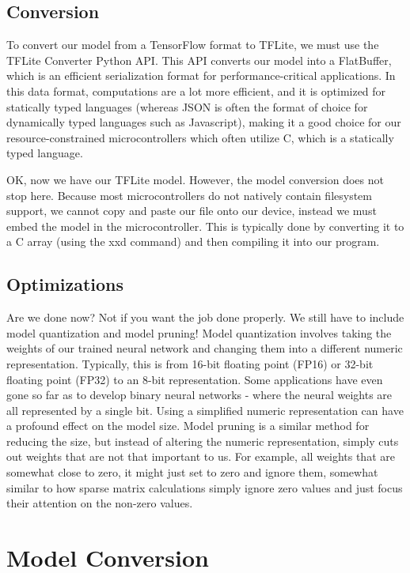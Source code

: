 {{{{{    \subsection{Conversion}
    
    To convert our model from a TensorFlow format to TFLite, we must use the TFLite Converter Python API. This API converts our model into a FlatBuffer, which is an efficient serialization format for performance-critical applications. In this data format, computations are a lot more efficient, and it is optimized for statically typed languages (whereas JSON is often the format of choice for dynamically typed languages such as Javascript), making it a good choice for our resource-constrained microcontrollers which often utilize C, which is a statically typed language.
    
    OK, now we have our TFLite model. However, the model conversion does not stop here. Because most microcontrollers do not natively contain filesystem support, we cannot copy and paste our file onto our device, instead we must embed the model in the microcontroller. This is typically done by converting it to a C array (using the xxd command) and then compiling it into our program.
    
    \subsection{Optimizations}
    
    Are we done now? Not if you want the job done properly. We still have to include model quantization and model pruning! Model quantization involves taking the weights of our trained neural network and changing them into a different numeric representation. Typically, this is from 16-bit floating point (FP16) or 32-bit floating point (FP32) to an 8-bit representation. Some applications have even gone so far as to develop binary neural networks - where the neural weights are all represented by a single bit. Using a simplified numeric representation can have a profound effect on the model size. Model pruning is a similar method for reducing the size, but instead of altering the numeric representation, simply cuts out weights that are not that important to us. For example, all weights that are somewhat close to zero, it might just set to zero and ignore them, somewhat similar to how sparse matrix calculations simply ignore zero values and just focus their attention on the non-zero values. 
 
\section{Model Conversion}

}}}}}
